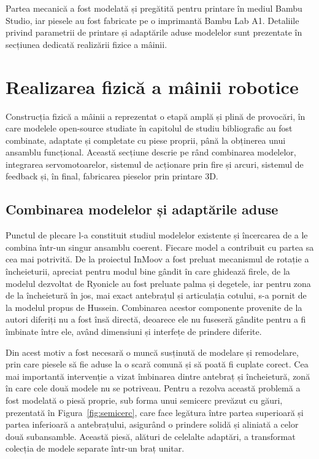 Partea mecanică a fost modelată și pregătită pentru printare în mediul Bambu Studio,
iar piesele au fost fabricate pe o imprimantă Bambu Lab A1. Detaliile privind
parametrii de printare și adaptările aduse modelelor sunt prezentate în secțiunea
dedicată realizării fizice a mâinii.

\section{Realizarea fizică a mâinii robotice}
\label{sec:proiectare-fizic}

Construcția fizică a mâinii a reprezentat o etapă amplă și plină de provocări, în
care modelele open-source studiate în capitolul de studiu bibliografic au fost
combinate, adaptate și completate cu piese proprii, până la obținerea unui ansamblu
funcțional. Această secțiune descrie pe rând combinarea modelelor, integrarea
servomotoarelor, sistemul de acționare prin fire și arcuri, sistemul de feedback și,
în final, fabricarea pieselor prin printare 3D.

\subsection{Combinarea modelelor și adaptările aduse}

Punctul de plecare l-a constituit studiul modelelor existente și încercarea de a le
combina într-un singur ansamblu coerent. Fiecare model a contribuit cu partea sa cea
mai potrivită. De la proiectul InMoov a fost preluat mecanismul de rotație a
încheieturii, apreciat pentru modul bine gândit în care ghidează firele, de la
modelul dezvoltat de Ryonicle au fost preluate palma și degetele, iar pentru zona de
la încheietură în jos, mai exact antebrațul și articulația cotului, s-a pornit de la
modelul propus de Hussein. Combinarea acestor componente provenite de la autori
diferiți nu a fost însă directă, deoarece ele nu fuseseră gândite pentru a fi
îmbinate între ele, având dimensiuni și interfețe de prindere diferite.

Din acest motiv a fost necesară o muncă susținută de modelare și remodelare, prin
care piesele să fie aduse la o scară comună și să poată fi cuplate corect. Cea mai
importantă intervenție a vizat îmbinarea dintre antebraț și încheietură, zonă în
care cele două modele nu se potriveau. Pentru a rezolva această problemă a fost
modelată o piesă proprie, sub forma unui semicerc prevăzut cu găuri, prezentată în
Figura~\ref{fig:semicerc}, care face
legătura între partea superioară și partea inferioară a antebrațului, asigurând o
prindere solidă și aliniată a celor două subansamble. Această piesă, alături de
celelalte adaptări, a transformat colecția de modele separate într-un braț unitar.

